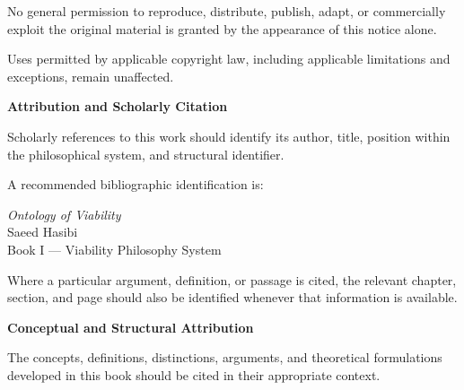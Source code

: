 No general permission to reproduce, distribute, publish, adapt,
or commercially exploit the original material is granted by
the appearance of this notice alone.

Uses permitted by applicable copyright law, including applicable
limitations and exceptions, remain unaffected.


\vspace{0.9cm}



\noindent
\textbf{Attribution and Scholarly Citation}

\vspace{0.3cm}

\noindent
Scholarly references to this work should identify its author,
title, position within the philosophical system, and structural
identifier.

A recommended bibliographic identification is:

\begin{center}

\textit{Ontology of Viability}\\
Saeed Hasibi\\
Book I — Viability Philosophy System\\
\BookID

\end{center}

\vspace{0.3cm}

\noindent
Where a particular argument, definition, or passage is cited,
the relevant chapter, section, and page should also be identified
whenever that information is available.


\vspace{0.9cm}



\noindent
\textbf{Conceptual and Structural Attribution}

\vspace{0.3cm}

\noindent
The concepts, definitions, distinctions, arguments, and theoretical
formulations developed in this book should be cited in their
appropriate context.

